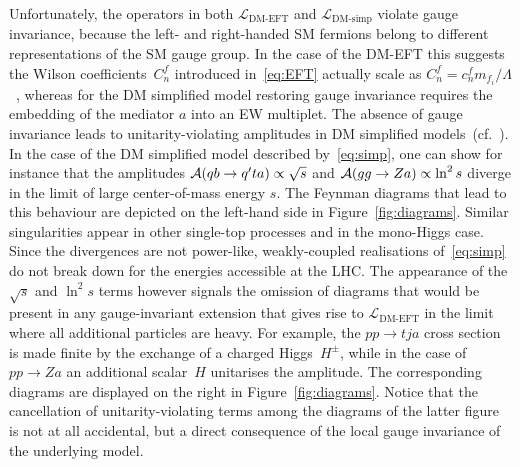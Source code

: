\documentclass[a4paper, 11pt,notoc]{article}
\begin{document}
Unfortunately, the operators in both $\mathcal{L}_\text{DM-EFT}$ and $\mathcal{L}_\text{DM-simp}$ violate gauge invariance, because the left- and right-handed SM fermions belong to different representations of the SM gauge group. In the case of the DM-EFT this suggests the Wilson coefficients~$C_n^f$ introduced in~\eqref{eq:EFT} actually scale as $C_n^f = c_n^f m_{f_i}/\Lambda$~\cite{Bell:2015sza}, whereas for the DM simplified model restoring gauge invariance requires the embedding of the mediator $a$ into an EW multiplet. The absence of gauge invariance leads to unitarity-violating amplitudes in DM simplified models~(cf.~\cite{Bell:2015sza,Bell:2015rdw,Haisch:2016usn,Englert:2016joy}). In the case of the DM simplified model described by~\eqref{eq:simp}, one can show for instance that the amplitudes ${\cal A} ( q b \to q^\prime t a) \propto \sqrt{s}$ and ${\cal A} ( g g \to Z a ) \propto \ln^2 s$ diverge in the limit of large center-of-mass energy $s$. The Feynman diagrams that lead to this behaviour are depicted on the left-hand side in Figure~\ref{fig:diagrams}. Similar singularities appear in other single-top processes and in the mono-Higgs case.  Since the divergences are not power-like, weakly-coupled realisations of~\eqref{eq:simp} do not break down for the energies accessible at the LHC. The appearance of the $\sqrt{s}$ and $\ln^2 s$ terms however signals the omission of diagrams that would be present in any gauge-invariant extension that gives rise to $\mathcal{L}_\text{DM-EFT}$ in the limit where all additional particles are heavy.   For example, the $pp \to tj a$ cross section is made finite by the exchange of a charged Higgs~$H^\pm$, while in the case of $pp \to Za$  an additional scalar~$H$ unitarises the amplitude. The corresponding diagrams are displayed on the right in Figure~\ref{fig:diagrams}. Notice that the cancellation of unitarity-violating terms among the diagrams of the latter figure is not at all accidental, but a direct consequence of the local gauge invariance of the underlying model.
\end{document}
